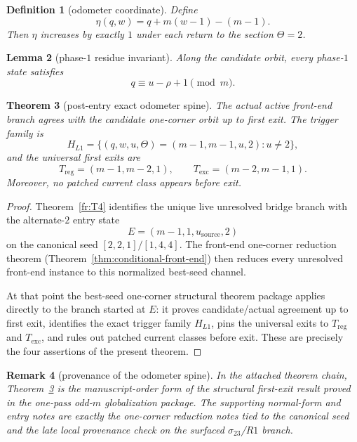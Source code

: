 \documentclass[11pt]{article}
\newtheorem{theorem}{Theorem}[section]
\newtheorem{lemma}[theorem]{Lemma}
\newtheorem{remark}[theorem]{Remark}
\newtheorem{definition}[theorem]{Definition}
\newcommand{\CanL}{[2,2,1]}
\newcommand{\CanR}{[1,4,4]}
\newcommand{\CanSeed}{\CanL/\CanR}
\begin{document}
\begin{definition}[odometer coordinate]
Define
\[
\eta(q,w)=q+m(w-1)-(m-1).
\]
Then \(\eta\) increases by exactly \(1\) under each return to the section
\(\Theta=2\).
\end{definition}

\begin{lemma}[phase-$1$ residue invariant]
Along the candidate orbit, every phase-$1$ state satisfies
\[
q\equiv u-\rho+1 \pmod m.
\]
\end{lemma}

\begin{theorem}[post-entry exact odometer spine]
\label{thm:odometer-spine}
The actual active front-end branch agrees with the candidate one-corner
orbit up to first exit.
The trigger family is
\[
H_{L1}=\{(q,w,u,\Theta)=(m-1,m-1,u,2):u\neq 2\},
\]
and the universal first exits are
\[
T_{\mathrm{reg}}=(m-1,m-2,1),
\qquad
T_{\mathrm{exc}}=(m-2,m-1,1).
\]
Moreover, no patched current class appears before exit.
\end{theorem}

\begin{proof}
Theorem~\ref{fr:T4} identifies the unique live unresolved bridge branch with the
alternate-$2$ entry state
\[
E=(m-1,1,u_{\mathrm{source}},2)
\]
on the canonical seed \(\CanSeed\).
The front-end one-corner reduction theorem
(Theorem~\ref{thm:conditional-front-end}) then reduces every unresolved
front-end instance to this normalized best-seed channel.

At that point the best-seed one-corner structural theorem package applies
directly to the branch started at \(E\): it proves candidate/actual agreement up
to first exit, identifies the exact trigger family \(H_{L1}\), pins the
universal exits to \(T_{\mathrm{reg}}\) and \(T_{\mathrm{exc}}\), and rules out
patched current classes before exit.
These are precisely the four assertions of the present theorem.
\end{proof}

\begin{remark}[provenance of the odometer spine]
In the attached theorem chain, Theorem~\ref{thm:odometer-spine} is the
manuscript-order form of the structural first-exit result proved in the one-pass
odd-$m$ globalization package.
The supporting normal-form and entry notes are exactly the one-corner reduction
notes tied to the canonical seed and the late local provenance check on the
surfaced $\sigma_{23}$/$R1$ branch.
\end{remark}
\end{document}
